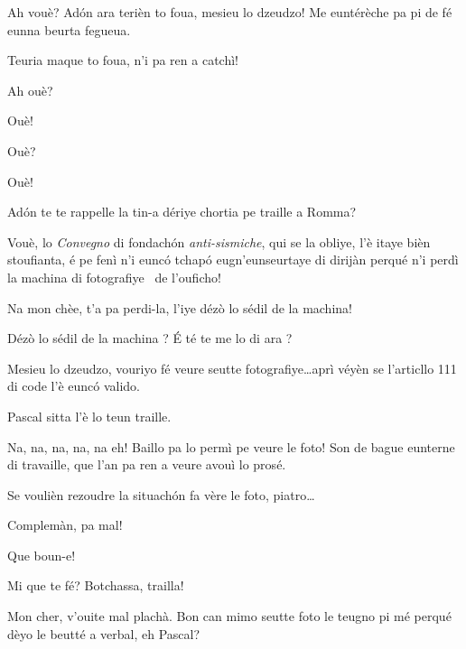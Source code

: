 \begin{drama}
\Bertinaspeaks Ah vouè? Adón ara terièn to foua, mesieu lo dzeudzo! Me euntérèche pa pi de fé eunna beurta fegueua.

\Tobiespeaks Teuria maque to foua, n’i pa ren a catchì!

\Bertinaspeaks Ah ouè?

\Tobiespeaks Ouè!

\Bertinaspeaks Ouè?

\Tobiespeaks Ouè!

\Bertinaspeaks Ad\'on te te rappelle la tin-a dériye chortia pe traille a Romma?

\Tobiespeaks Vouè, lo \textit{Convegno} di fondachón \textit{anti-sismiche}, qui se la obliye, l’è itaye bièn stoufianta, é pe fenì n’i eunc\'o tchap\'o eugn’eunseurtaye di dirijàn perqué n’i perdì la machina di fotografiye \macchinaFoto\ de l’ouficho!

\Bertinaspeaks Na mon chèe, t’a pa perdi-la, l'iye dézò lo sédil de la machina!

\Tobiespeaks {} Dézò lo sédil de la machina ? É té te me lo di ara ?

\Bertinaspeaks Mesieu lo dzeudzo, vouriyo fé veure seutte fotografiye\ldots aprì véyèn se l’articllo 111 di code l’è eunc\'o valido.

\DzeudzoSenliquerspeaks Pascal sitta l’è lo teun traille.

\Tobiespeaks Na, na, na, na, na eh!  Baillo pa lo permì pe veure le foto! Son de bague eunterne di travaille, que l’an pa ren a veure avouì lo prosé.

\DzeudzoSenliquerspeaks Se voulièn rezoudre la situach\'on fa vère le foto, piatro\ldots



\DzeudzoSenliquerspeaks {} Complemàn, pa mal!

\Simonspeaks Que boun-e!

\Eumprezeospeaks Mi que te fé? Botchassa, trailla!

\DzeudzoSenliquerspeaks {} Mon cher, v'ouite mal plachà. Bon can mimo seutte foto le teugno pi mé perqué dèyo le beutté a verbal, eh Pascal?  \ok


\end{drama}
